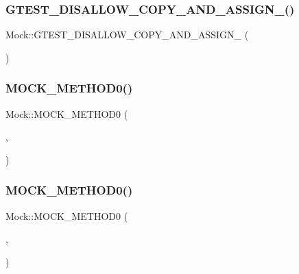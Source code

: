 \subsubsection{\texorpdfstring{GTEST\_DISALLOW\_COPY\_AND\_ASSIGN\_()}{GTEST\_DISALLOW\_COPY\_AND\_ASSIGN\_()}\hspace{0.1cm}{\footnotesize\ttfamily [6/6]}}
{\footnotesize\ttfamily Mock\+::\+G\+T\+E\+S\+T\+\_\+\+D\+I\+S\+A\+L\+L\+O\+W\+\_\+\+C\+O\+P\+Y\+\_\+\+A\+N\+D\+\_\+\+A\+S\+S\+I\+G\+N\+\_\+ (\begin{DoxyParamCaption}\item[{\mbox{\hyperlink{class_mock}{Mock}}}]{ }\end{DoxyParamCaption})\hspace{0.3cm}{\ttfamily [private]}}

\mbox{\label{class_mock_ae710f23cafb1a2f17772e8805d6312d2}} 
\subsubsection{\texorpdfstring{MOCK\_METHOD0()}{MOCK\_METHOD0()}\hspace{0.1cm}{\footnotesize\ttfamily [1/3]}}
{\footnotesize\ttfamily Mock\+::\+M\+O\+C\+K\+\_\+\+M\+E\+T\+H\+O\+D0 (\begin{DoxyParamCaption}\item[{Do\+This}]{,  }\item[{void()}]{ }\end{DoxyParamCaption})}

\mbox{\label{class_mock_ae710f23cafb1a2f17772e8805d6312d2}} 
\subsubsection{\texorpdfstring{MOCK\_METHOD0()}{MOCK\_METHOD0()}\hspace{0.1cm}{\footnotesize\ttfamily [2/3]}}
{\footnotesize\ttfamily Mock\+::\+M\+O\+C\+K\+\_\+\+M\+E\+T\+H\+O\+D0 (\begin{DoxyParamCaption}\item[{Do\+This}]{,  }\item[{void()}]{ }\end{DoxyParamCaption})}

